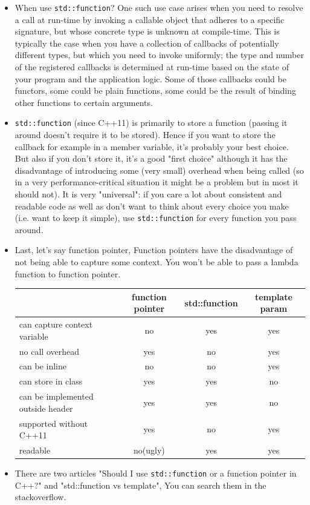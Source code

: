 \documentclass[a4paper,11pt,twoside]{book}
\begin{document}
\begin{itemize}
	\item When use \texttt{std::function}? One such use case arises when you need to resolve a call at run-time by invoking a callable object that adheres to a specific signature, but whose concrete type is unknown at compile-time. This is typically the case when you have a collection of callbacks of potentially different types, but which you need to invoke uniformly; the type and number of the registered callbacks is determined at run-time based on the state of your program and the application logic. Some of those callbacks could be functors, some could be plain functions, some could be the result of binding other functions to certain arguments.
	
	\item \texttt{std::function} (since C++11) is primarily to store a function (passing it around doesn't require it to be stored). Hence if you want to store the callback for example in a member variable, it's probably your best choice. But also if you don't store it, it's a good "first choice" although it has the disadvantage of introducing some (very small) overhead when being called (so in a very performance-critical situation it might be a problem but in most it should not). It is very "universal": if you care a lot about consistent and readable code as well as don't want to think about every choice you make (i.e. want to keep it simple), use \texttt{std::function} for every function you pass around.
	
	\item Last, let's say function pointer, Function pointers have the disadvantage of not being able to capture some context. You won't be able to pass a lambda function to function pointer. 
	
	
 	\begin{tabular}{| p{}| c | c| c |}
		\hline
		 & function pointer  & std::function  & template param  \\
		\hline
		can capture context variable & no  & yes  & yes  \\
		\hline
		no call overhead & yes & no  & yes \\
		\hline
		can be inline& no &  no & yes \\
		\hline
		can store in class& yes & yes & no \\
		\hline
		can be implemented outside header& yes  & yes & no \\
		\hline
		supported without C++11& yes & no  & yes \\
		\hline
		readable & no(ugly) & yes  & yes  \\
		\hline
	\end{tabular}
	
	
	\item There are two articles "Should I use \texttt{std::function} or a function pointer in C++?" and "std::function vs template", You can search them in the stackoverflow.
	
\end{itemize}
\end{document}
